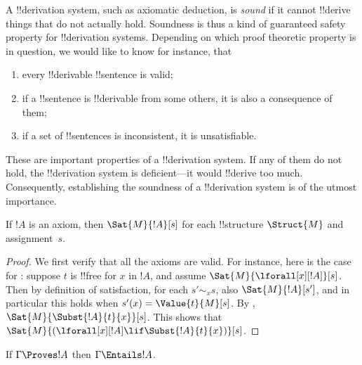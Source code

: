 \documentclass[../../include/open-logic-section]{subfiles}
\begin{document}

\begin{explain}
A !!{derivation} system, such as axiomatic deduction, is \emph{sound}
if it cannot !!{derive} things that do not actually hold.  Soundness is
thus a kind of guaranteed safety property for !!{derivation} systems.
Depending on which proof theoretic property is in question, we would
like to know for instance, that
\begin{enumerate}
\item every !!{derivable} !!{sentence} is valid;
\item if a !!{sentence} is !!{derivable} from some others, it is also a
  consequence of them;
\item if a set of !!{sentence}s is inconsistent, it is unsatisfiable.
\end{enumerate}
These are important properties of a !!{derivation} system.  If any of them do
not hold, the !!{derivation} system is deficient---it would !!{derive} too much.
Consequently, establishing the soundness of a !!{derivation} system is of the
utmost importance.
\end{explain}

\begin{prop}
If $!A$ is an axiom, then $\Sat{M}{!A}[s]$ for each !!{structure}
$\Struct{M}$ and assignment~$s$.
\end{prop}

\begin{proof}
We first verify that all the axioms are
valid. For instance, here is the case for : suppose $t$ is
!!{free for} $x$ in $!A$, and assume
$\Sat{M}{\lforall[x][!A]}[s]$. Then by definition of satisfaction, for
each $s' \sim_x s$, also $\Sat{M}{!A}[s']$, and in particular this
holds when $s'(x) = \Value{t}{M}[s]$. By
,
$\Sat{M}{\Subst{!A}{t}{x}}[s]$. This shows that
$\Sat{M}{(\lforall[x][!A] \lif \Subst{!A}{t}{x})}[s]$.
\end{proof}

\begin{thm}[Soundness]
If $\Gamma \Proves !A$ then $\Gamma \Entails !A$.
\end{thm}
\end{document}
